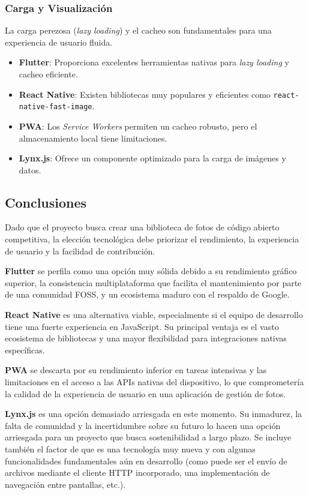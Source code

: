 \subsubsection{Carga y Visualización}
La carga perezosa (\textit{lazy loading}) y el cacheo son fundamentales para una experiencia de usuario fluida.
\begin{itemize}
    \item \textbf{Flutter}: Proporciona excelentes herramientas nativas para \textit{lazy loading} y cacheo eficiente.
    \item \textbf{React Native}: Existen bibliotecas muy populares y eficientes como \texttt{react-native-fast-image}.
    \item \textbf{PWA}: Los \textit{Service Workers} permiten un cacheo robusto, pero el almacenamiento local tiene limitaciones.
    \item \textbf{Lynx.js}: Ofrece un componente optimizado para la carga de imágenes y datos.
\end{itemize}

\subsection{Conclusiones}

Dado que el proyecto busca crear una biblioteca de fotos de código abierto competitiva, la elección tecnológica debe priorizar el rendimiento, la experiencia de usuario y la facilidad de contribución.

\textbf{Flutter} se perfila como una opción muy sólida debido a su rendimiento gráfico superior, la consistencia multiplataforma que facilita el mantenimiento por parte de una comunidad FOSS, y un ecosistema maduro con el respaldo de Google.

\textbf{React Native} es una alternativa viable, especialmente si el equipo de desarrollo tiene una fuerte experiencia en JavaScript. Su principal ventaja es el vasto ecosistema de bibliotecas y una mayor flexibilidad para integraciones nativas específicas.

\textbf{PWA} se descarta por su rendimiento inferior en tareas intensivas y las limitaciones en el acceso a las APIs nativas del dispositivo, lo que comprometería la calidad de la experiencia de usuario en una aplicación de gestión de fotos.

\textbf{Lynx.js} es una opción demasiado arriesgada en este momento. Su inmadurez, la falta de comunidad y la incertidumbre sobre su futuro lo hacen una opción arriesgada para un proyecto que busca sostenibilidad a largo plazo.
Se incluye también el factor de que es una tecnología muy nueva y con algunas funcionalidades fundamentales aún en desarrollo (como puede ser el envío de archivos mediante el cliente HTTP incorporado, una implementación de navegación entre pantallas, etc.).

